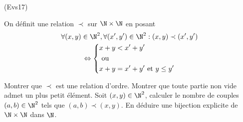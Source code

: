 \begin{tiny}(Evs17)\end{tiny} On définit une relation $\prec$ sur $\N\times \N$ en posant
\begin{multline*}
 \forall (x,y)\in \N^2, \forall (x',y')\in \N^2:
(x,y)\prec (x',y')\\
\Leftrightarrow
\left\lbrace 
\begin{aligned}
& x+y < x'+y'\\
&\text{ ou }\\
&x+y = x'+y' \text{ et } y\leq y'
\end{aligned}
\right. 
\end{multline*}

Montrer que $\prec$ est une relation d'ordre. Montrer que toute partie non vide admet un plus petit élément.\newline
Soit $(x,y)\in \N^2$, calculer le nombre de couples $(a,b)\in \N^2$ tels que $(a,b) \prec (x,y)$. En déduire une bijection explicite de $\N\times \N$ dans $\N$.
